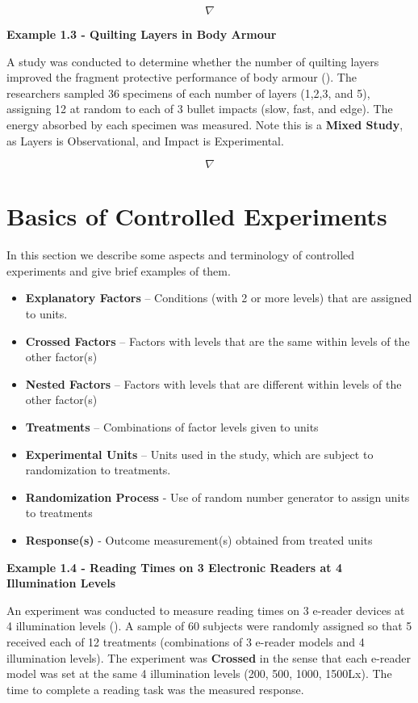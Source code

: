 \documentclass[
]{book}
\providecommand{\tightlist}{%
  \setlength{\itemsep}{0pt}\setlength{\parskip}{0pt}}
\begin{document}
\[\nabla\]

\textbf{Example 1.3 - Quilting Layers in Body Armour}

A study was conducted to determine whether the number of quilting layers
improved the fragment protective performance of body armour
(). The researchers sampled 36
specimens of each number of layers (1,2,3, and 5), assigning 12 at
random to each of 3 bullet impacts (slow, fast, and edge). The energy
absorbed by each specimen was measured. Note this is a \textbf{Mixed
Study}, as Layers is Observational, and Impact is Experimental.

\[\nabla\]

\section{Basics of Controlled
Experiments}\label{basics-of-controlled-experiments}

In this section we describe some aspects and terminology of controlled
experiments and give brief examples of them.

\begin{itemize}
\tightlist
\item
  \textbf{Explanatory Factors} -- Conditions (with 2 or more levels)
  that are assigned to units.
\item
  \textbf{Crossed Factors} -- Factors with levels that are the same
  within levels of the other factor(s)
\item
  \textbf{Nested Factors} -- Factors with levels that are different
  within levels of the other factor(s)
\item
  \textbf{Treatments} -- Combinations of factor levels given to units
\item
  \textbf{Experimental Units} -- Units used in the study, which are
  subject to randomization to treatments.
\item
  \textbf{Randomization Process} - Use of random number generator to
  assign units to treatments
\item
  \textbf{Response(s)} - Outcome measurement(s) obtained from treated
  units
\end{itemize}

\textbf{Example 1.4 - Reading Times on 3 Electronic Readers at 4
Illumination Levels}

An experiment was conducted to measure reading times on 3 e-reader
devices at 4 illumination levels (). A sample of 60 subjects were randomly assigned so that
5 received each of 12 treatments (combinations of 3 e-reader models and
4 illumination levels). The experiment was \textbf{Crossed} in the sense
that each e-reader model was set at the same 4 illumination levels (200,
500, 1000, 1500Lx). The time to complete a reading task was the measured
response.
\end{document}
